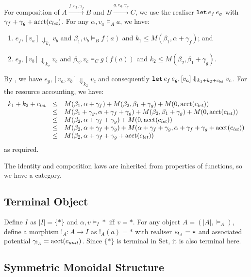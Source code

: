 \documentclass{workingnote}
\newcommand{\Set}{\mathrm{Set}}
\newcommand{\account}{\mathrm{acct}}
\begin{document}
For composition of $A \stackrel{f,e_f,\gamma_f}\longrightarrow B$ and
$B \stackrel{g,e_g,\gamma_g}\longrightarrow C$, we use the realiser
$\texttt{let}\,e_f\,e_g$ with $\gamma_f + \gamma_g + \account(\cnstLet)$. For
any $\alpha, v_a \models_A a$, we have:
\begin{enumerate}
\item $e_f,[v_a] \Downarrow_{k_1} v_b$ and $\beta_1, v_b \models_B f(a)$ and $k_1 \leq M(\beta_1, \alpha + \gamma_f)$; and
\item $e_g,[v_b] \Downarrow_{k_2} v_c$ and $\beta_2, v_c \models_C g(f(a))$ and $k_2 \leq M(\beta_2, \beta_1 + \gamma_g)$.
\end{enumerate}
By , we have
$e_g,[v_a,v_b] \Downarrow_{k_2} v_c$ and consequently
$\texttt{let}\,e_f\,e_g,[v_a] \Downarrow_{k_1+k_2+c_{\mathit{let}}} v_c$. For the
resource accounting, we have:
\begin{displaymath}
  \begin{array}{lcl}
    k_1 + k_2 + \cnstLet
    &\leq&M(\beta_1, \alpha+\gamma_f) + M(\beta_2,\beta_1+\gamma_g) + M(0,\account(\cnstLet)) \\
    &\leq&M(\beta_1+\gamma_g,\alpha+\gamma_f+\gamma_g) + M(\beta_2,\beta_1+\gamma_g) + M(0,\account(\cnstLet))\\
    &\leq&M(\beta_2,\alpha+\gamma_f+\gamma_g) + M(0,\account(\cnstLet)) \\
    &\leq&M(\beta_2,\alpha+\gamma_f+\gamma_g) + M(\alpha+\gamma_f+\gamma_g,\alpha+\gamma_f+\gamma_g+\account(\cnstLet)) \\
    &\leq&M(\beta_2,\alpha+\gamma_f+\gamma_g+\account(\cnstLet)) \\
  \end{array}
\end{displaymath}
as required.

The identity and composition laws are inherited from properties of
functions, so we have a category.

\subsection{Terminal Object}

Define $I$ as $|I| = \{*\}$ and $\alpha, v \models_I *$ iff $v =
*$. For any object $A = (|A|, \models_A)$, define a morphism
$!_A : A \to I$ as $!_A(a) = *$ with realiser $e_{!_A} = \texttt{*}$ and
associated potential $\gamma_{!_A} = \account(\cnstUnitVal)$. Since
$\{*\}$ is terminal in $\Set$, it is also terminal here.

\subsection{Symmetric Monoidal Structure}
\end{document}
